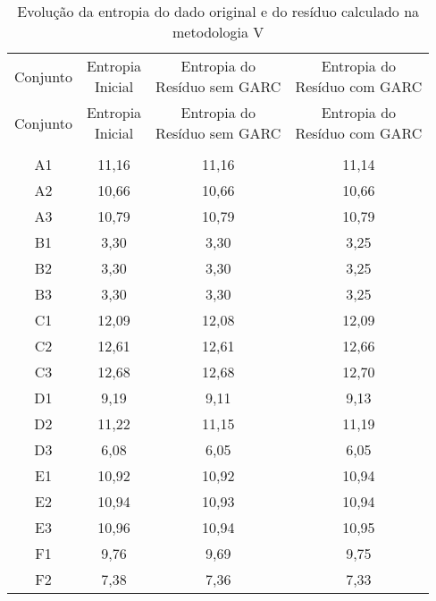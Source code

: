 \begin{center}
\begin{longtable}{cccc}
\toprule
\rowcolor{white}
\caption[Metodologia V: evolução da entropia]{Evolução da entropia do dado
original e do resíduo calculado na metodologia V}
\label{tab:EvolucaoEntropiaMet5}\\
\midrule
Conjunto & \specialcell{Entropia \\Inicial} & \specialcell{Entropia do
\\Resíduo sem GARC} & \specialcell{Entropia do
\\Resíduo com GARC}  \\
\midrule
\endfirsthead
\midrule
\rowcolor{white}
Conjunto & \specialcell{Entropia \\Inicial} & \specialcell{Entropia do
\\Resíduo sem GARC} & \specialcell{Entropia do
\\Resíduo com GARC}  \\
\toprule
\endhead
\midrule \\ %
\endfoot
\bottomrule 
\endlastfoot
    A1    & 11,16 & 11,16 & 11,14 \\
    A2    & 10,66 & 10,66 & 10,66 \\
    A3    & 10,79 & 10,79 & 10,79 \\
    B1    & 3,30  & 3,30  & 3,25 \\
    B2    & 3,30  & 3,30  & 3,25 \\
    B3    & 3,30  & 3,30  & 3,25 \\
    C1    & 12,09 & 12,08 & 12,09 \\
    C2    & 12,61 & 12,61 & 12,66 \\
    C3    & 12,68 & 12,68 & 12,70 \\
    D1    & 9,19  & 9,11  & 9,13 \\
    D2    & 11,22 & 11,15 & 11,19 \\
    D3    & 6,08  & 6,05  & 6,05 \\
    E1    & 10,92 & 10,92 & 10,94 \\
    E2    & 10,94 & 10,93 & 10,94 \\
    E3    & 10,96 & 10,94 & 10,95 \\
    F1    & 9,76  & 9,69  & 9,75 \\
    F2    & 7,38  & 7,36  & 7,33 \\

\end{longtable}
\end{center}
